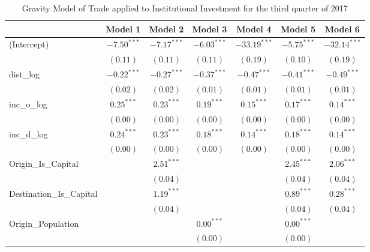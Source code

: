 \begin{table}
	\begin{center}
		\small
		\caption[Gravity Model of trade for Q3 2017]{Gravity Model of Trade applied to Institutional Investment for the third quarter of 2017}
		\begin{tabular}{l c c c c c c }
			\hline
			& Model 1 & Model 2 & Model 3 & Model 4 & Model 5 & Model 6 \\
			\hline
			(Intercept)                  & $-7.50^{***}$ & $-7.17^{***}$ & $-6.03^{***}$ & $-33.19^{***}$ & $-5.75^{***}$ & $-32.14^{***}$ \\
			& $(0.11)$      & $(0.11)$      & $(0.11)$      & $(0.19)$       & $(0.10)$      & $(0.19)$       \\
			dist\_log                    & $-0.22^{***}$ & $-0.27^{***}$ & $-0.37^{***}$ & $-0.47^{***}$  & $-0.41^{***}$ & $-0.49^{***}$  \\
			& $(0.02)$      & $(0.02)$      & $(0.01)$      & $(0.01)$       & $(0.01)$      & $(0.01)$       \\
			inc\_o\_log                  & $0.25^{***}$  & $0.23^{***}$  & $0.19^{***}$  & $0.15^{***}$   & $0.17^{***}$  & $0.14^{***}$   \\
			& $(0.00)$      & $(0.00)$      & $(0.00)$      & $(0.00)$       & $(0.00)$      & $(0.00)$       \\
			inc\_d\_log                  & $0.24^{***}$  & $0.23^{***}$  & $0.18^{***}$  & $0.14^{***}$   & $0.18^{***}$  & $0.14^{***}$   \\
			& $(0.00)$      & $(0.00)$      & $(0.00)$      & $(0.00)$       & $(0.00)$      & $(0.00)$       \\
			Origin\_Is\_Capital          &               & $2.51^{***}$  &               &                & $2.45^{***}$  & $2.06^{***}$   \\
			&               & $(0.04)$      &               &                & $(0.04)$      & $(0.04)$       \\
			Destination\_Is\_Capital     &               & $1.19^{***}$  &               &                & $0.89^{***}$  & $0.28^{***}$   \\
			&               & $(0.04)$      &               &                & $(0.04)$      & $(0.04)$       \\
			Origin\_Population           &               &               & $0.00^{***}$  &                & $0.00^{***}$  &                \\
			&               &               & $(0.00)$      &                & $(0.00)$      &                \\

\end{tabular}
\end{center}
\end{table}
